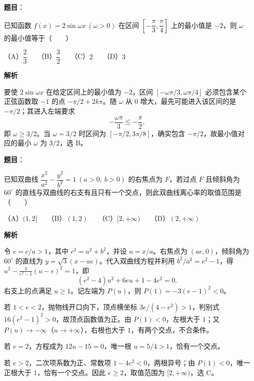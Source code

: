 \begin{answer}

\textbf{题目}：

已知函数 $f(x)=2\sin\omega x\ (\omega>0)$ 在区间 $\left[-\dfrac\pi3,\dfrac\pi4\right]$ 上的最小值是 $-2$，则 $\omega$ 的最小值等于\mbox{（　　）}

（A）$\dfrac23$　　（B）$\dfrac32$　　（C）$2$　　（D）$3$

\textbf{解析}

要使 $2\sin\omega x$ 在给定区间上的最小值为 $-2$，区间 $[-\omega\pi/3,\omega\pi/4]$ 必须包含某个正弦函数取 $-1$ 的点 $-\pi/2+2k\pi$。随 $\omega$ 从 $0$ 增大，最先可能进入该区间的是 $-\pi/2$；其进入左端要求
\nopagebreak[4]
\[
-\frac{\omega\pi}{3}\le-\frac\pi2,
\]
即 $\omega\ge3/2$。当 $\omega=3/2$ 时区间为 $[-\pi/2,3\pi/8]$，确实包含 $-\pi/2$，故最小值对应的最小 $\omega$ 为 $3/2$，选 B。


\end{answer}
\begin{answer}

\textbf{题目}：

已知双曲线 $\dfrac{x^2}{a^2}-\dfrac{y^2}{b^2}=1\ (a>0,\ b>0)$ 的右焦点为 $F$，若过点 $F$ 且倾斜角为 $60^\circ$ 的直线与双曲线的右支有且只有一个交点，则此双曲线离心率的取值范围是\mbox{（　　）}

（A）$(1,2]$　　（B）$(1,2)$　　（C）$[2,+\infty)$　　（D）$(2,+\infty)$

\textbf{解析}

令 $e=c/a>1$，其中 $c^2=a^2+b^2$，并设 $u=x/a$。右焦点为 $(ae,0)$，倾斜角为 $60^\circ$ 的直线为 $y=\sqrt3(x-ae)$。代入双曲线方程并利用 $b^2/a^2=e^2-1$，得 $u^2-\frac3{e^2-1}(u-e)^2=1$，即
\nopagebreak[4]
\[
(e^2-4)u^2+6eu+1-4e^2=0.
\]
右支上的点满足 $u\ge1$。记左端为 $P(u)$，则 $P(1)=-3(e-1)^2<0$。

若 $1<e<2$，抛物线开口向下，顶点横坐标 $3e/(4-e^2)>1$，判别式 $16(e^2-1)^2>0$，故顶点函数值为正。由 $P(1)<0$，左根大于 $1$；又 $P(u)\to-\infty$（$u\to+\infty$），右根也大于 $1$，有两个交点，不合条件。

若 $e=2$，方程成为 $12u-15=0$，唯一根 $u=5/4>1$，恰有一个交点。

若 $e>2$，二次项系数为正、常数项 $1-4e^2<0$，两根异号；由 $P(1)<0$，唯一正根大于 $1$，恰有一个交点。因此 $e\ge2$，取值范围为 $[2,+\infty)$，选 C。

\gkanswer{答案：C，$[2,+\infty)$}

\end{answer}
